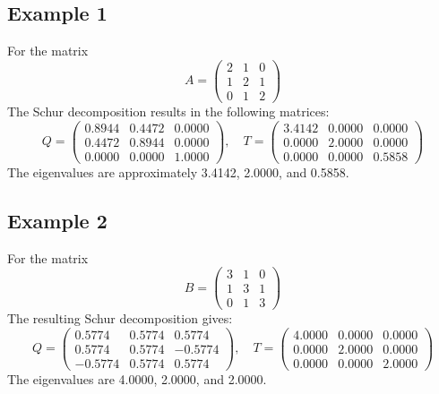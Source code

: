 \documentclass[journal]{IEEEtran}
\begin{document}
\subsection{Example 1}
For the matrix
\[
A = \begin{pmatrix} 
2 & 1 & 0 \\
1 & 2 & 1 \\
0 & 1 & 2
\end{pmatrix}
\]
The Schur decomposition results in the following matrices:
\[
Q = \begin{pmatrix} 
0.8944 & 0.4472 & 0.0000 \\
0.4472 & 0.8944 & 0.0000 \\
0.0000 & 0.0000 & 1.0000
\end{pmatrix}, \quad
T = \begin{pmatrix} 
3.4142 & 0.0000 & 0.0000 \\
0.0000 & 2.0000 & 0.0000 \\
0.0000 & 0.0000 & 0.5858
\end{pmatrix}
\]
The eigenvalues are approximately 3.4142, 2.0000, and 0.5858.

\subsection{Example 2}
For the matrix
\[
B = \begin{pmatrix} 
3 & 1 & 0 \\
1 & 3 & 1 \\
0 & 1 & 3
\end{pmatrix}
\]
The resulting Schur decomposition gives:
\[
Q = \begin{pmatrix} 
0.5774 & 0.5774 & 0.5774 \\
0.5774 & 0.5774 & -0.5774 \\
-0.5774 & 0.5774 & 0.5774
\end{pmatrix}, \quad
T = \begin{pmatrix} 
4.0000 & 0.0000 & 0.0000 \\
0.0000 & 2.0000 & 0.0000 \\
0.0000 & 0.0000 & 2.0000
\end{pmatrix}
\]
The eigenvalues are 4.0000, 2.0000, and 2.0000.
\end{document}
